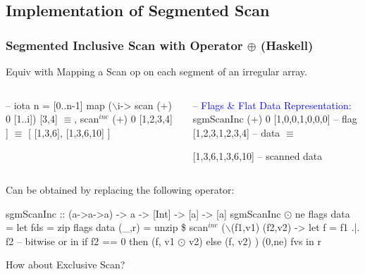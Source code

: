 \documentclass{beamer}
\newcommand{\blue}[1]{\textcolor{Blue}{{#1}}}
\renewcommand{\emph}[1]{\textcolor{structure}{#1}}
\newcommand{\emp}[1]{\textcolor{DikuRed}{ #1}}
\newcommand{\emphh}[1]{\textcolor{CosGreen}{ #1}}
\newcommand{\mymath}[1]{$ #1 $}
\newcommand{\myindu}[1]{^{#1}}
\begin{document}
\subsection{Implementation of Segmented Scan}

\begin{frame}[fragile]
	\tableofcontents[currentsubsection]
\end{frame}

\begin{frame}[fragile,t]
  \frametitle{Segmented Inclusive Scan with Operator $\oplus$ (Haskell)}

\emphh{Equiv with Mapping a Scan op on each segment of an irregular array.}

\begin{columns}
\begin{colorcode}
-- iota n = [0..n-1]
map (\mymath{\backslash}i-> scan (+) 0 [1..i]) [3,4] \emph{\mymath{\equiv}}\pause
[ scan\mymath{\myindu{inc}} (+) 0 [1,2,3], 
  scan\mymath{\myindu{inc}} (+) 0 [1,2,3,4] ] 
      \emph{\mymath{\equiv}}
[ [1,3,6], [1,3,6,10] ]
\end{colorcode}
\begin{colorcode}
-- \blue{Flags \& Flat Data Representation:}
sgmScanInc (+) 0 [1,0,0,1,0,0,0] -- \emph{flag}
                 [1,2,3,1,2,3,4] -- \emp{data}
    \emph{\mymath{\equiv}}

  [1,3,6,1,3,6,10]        -- \emp{scanned data}
\end{colorcode}
\end{columns}
\medskip



\emphh{Can be obtained by replacing the following operator:}
\smallskip

\begin{colorcode}
sgmScanInc :: (a->a->a) -> a -> [Int] -> [a] -> [a]
sgmScanInc \mymath{\odot} ne flags data = 
  let fds = zip flags data
      (_,r) = unzip \$ 
              scan\mymath{\myindu{inc}} (\mymath{\backslash}(f1,v1) (f2,v2) -> 
                        let f = f1 .|. f2  -- bitwise or
                        in  if f2 == 0
                            then (f, v1 \mymath{\odot} v2)
                            else (f, v2)
                     ) (0,ne) fvs
  in  r
\end{colorcode}

\bigskip

\alert{How about Exclusive Scan?}

\end{frame}
\end{document}

